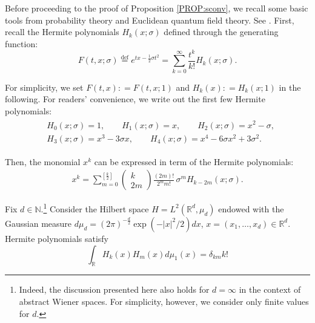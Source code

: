 \documentclass[letterpaper, 11pt,  reqno]{amsart}
\newcommand{\1}{\hspace{0.5mm}\text{I}\hspace{0.5mm}}
\newcommand{\noi}{\noindent}
\newcommand{\R}{\mathbb{R}}
\newcommand{\s}{\sigma}
\newcommand{\N}{\mathbb{N}}
\numberwithin{equation}{section}
\numberwithin{theorem}{section}
\newcommand{\hiro}[1]{\marginpar{\color{red} $\Leftarrow\Leftarrow\Leftarrow$}{\smallskip \noi\color{blue}HIRO: #1}\smallskip}
\begin{document}
%



Before proceeding to the proof of Proposition \ref{PROP:sconv}, 
we recall some basic tools from probability theory and Euclidean quantum field theory.
See \cite{Kuo, Nu, Simon}.
First, 
recall the Hermite polynomials $H_k(x; \s)$
defined through the generating function:
\begin{equation}
F(t, x; \s) \stackrel{\text{def}}{=}  e^{tx - \frac{1}{2}\s t^2} = \sum_{k = 0}^\infty \frac{t^k}{k!} H_k(x;\s).
\label{H1}
 \end{equation}
	
\noi
For simplicity, we set $F(t, x) : = F(t, x; 1)$
and $H_k(x) : = H_k(x; 1)$ in the following.
For readers' convenience, we write out the first few Hermite polynomials:
\begin{align}
\begin{split}
& H_0(x; \s) = 1, 
\qquad 
H_1(x; \s) = x, 
\qquad
H_2(x; \s) = x^2 - \s,   \\
& H_3(x; \s) = x^3 - 3\s x, 
\qquad 
H_4(x; \s) = x^4 - 6\s x^2 +3\s^2.
\end{split}
\label{H1a}
\end{align}
	
\noi
Then, the monomial $x^k$
can be expressed in term of the Hermite polynomials:
\begin{align}
x^k = \sum_{m = 0}^{[\frac{k}{2}]}
\begin{pmatrix}
k\\2m 
\end{pmatrix}
\frac{(2m)!}{2^m m!}\, \s^m H_{k-2m}(x; \s).
\label{H2}
\end{align}


Fix $d \in \N$.\footnote{Indeed, the discussion presented here also holds for $d = \infty$ 
in the context of abstract Wiener spaces.
For simplicity, however, we consider only finite values for $d$.} Consider the Hilbert space $H = L^2(\R^d, \mu_d)$
endowed with  the Gaussian measure 
 $d\mu_d
= (2\pi)^{-\frac{d}{2}} \exp(-{|x|^2}/{2})dx$, $x = (x_1, \dots,
x_d)\in \R^d$. 
Hermite polynomials satisfy
\begin{equation}
\int_{\R} H_k(x)H_m(x) d\mu_1(x)= \delta_{k m} k!
\label{H3}
\end{equation}
\end{document}
